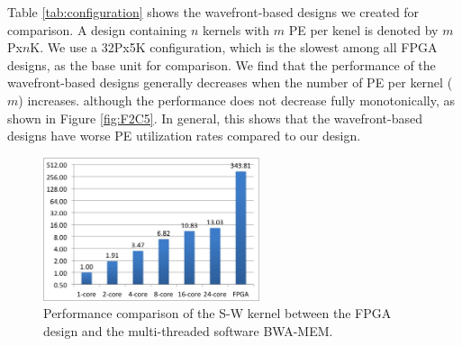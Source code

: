 Table \ref{tab:configuration} shows the wavefront-based designs we created for comparison. 
A design containing $n$ kernels with $m$ PE per kenel is denoted by $m$Px$n$K. 
We use a 32Px5K configuration, which is the slowest among all FPGA designs, as the base unit for comparison.
We find that the performance of the wavefront-based designs generally decreases when the number of PE per kernel ($m$) increases.
although the performance does not decrease fully monotonically, as shown in Figure \ref{fig:F2C5}.
In general, this shows that the wavefront-based designs have worse PE utilization rates compared to our design. 

\begin{figure}[!hbt]
	\begin{center}
		\includegraphics[width=2.5in]{Figures/F1C5.jpg}
		\caption {Performance comparison of the S-W kernel between the FPGA design and the multi-threaded software BWA-MEM.}
		\label{fig:F1C5}
	\end{center}
\end{figure}
\vspace{-10pt}




